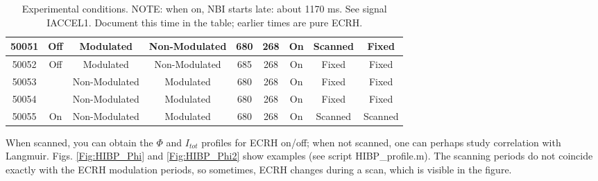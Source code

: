 \documentclass[preprint,12pt,authoryear]{elsarticle}
\begin{document}
\begin{center}
\begin{table}[!ht]
\begin{tabular}{|| c || c | c | c | c | c | c | c | c ||}
        \hline
        50051 & Off\cellcolor{MyBlue} & Modulated\cellcolor{Mygreen} & Non-Modulated\cellcolor{Myred} & 680 & 268 & On\cellcolor{Mygreen} & Scanned\cellcolor{Mygreen} & Fixed\cellcolor{Myred}\\
        \hline
        50052 & Off\cellcolor{MyBlue} & Modulated\cellcolor{Mygreen} & Non-Modulated\cellcolor{Myred} & 685 & 268 & On\cellcolor{Mygreen} & Fixed\cellcolor{Myred} & Fixed\cellcolor{Myred}\\
        \hline
        50053 &                       & Non-Modulated\cellcolor{Myred} & Modulated\cellcolor{Mygreen} & 680 & 268 & On\cellcolor{Mygreen} & Fixed\cellcolor{Myred} & Fixed\cellcolor{Myred}\\
        \hline
        50054 &                       & Non-Modulated\cellcolor{Myred} & Modulated\cellcolor{Mygreen} & 680 & 268 & On\cellcolor{Mygreen} & Fixed\cellcolor{Myred} & Fixed\cellcolor{Myred}\\
        \hline
        50055 & On\cellcolor{MyYellow}& Non-Modulated\cellcolor{Myred} & Modulated\cellcolor{Mygreen} & 680 & 268 & On\cellcolor{Mygreen} & Scanned\cellcolor{Mygreen} & Scanned\cellcolor{Mygreen}\\
        \hline
\end{tabular}
\caption{Experimental conditions. NOTE: when on, NBI starts late: about 1170 ms. See signal IACCEL1. Document this time in the table; earlier times are pure ECRH.}
    \label{tab:shots}
\end{table}
\end{center}

\clearpage
When scanned, you can obtain the $\Phi$ and $I_{tot}$ profiles for ECRH on/off; when not scanned, one can perhaps study correlation with Langmuir.
Figs. \ref{Fig:HIBP_Phi} and \ref{Fig:HIBP_Phi2} show examples (see script HIBP\_profile.m).
The scanning periods do not coincide exactly with the ECRH modulation periods, so sometimes, ECRH changes during a scan, which is visible in the figure.
\end{document}
